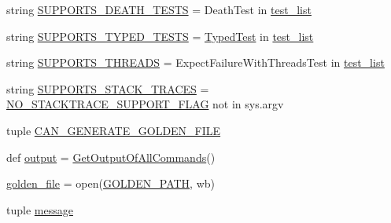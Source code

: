 \begin{DoxyCompactItemize}
\item 
string \mbox{\hyperlink{namespacegoogletest-master_1_1googletest_1_1test_1_1googletest-output-test_ab7a52bcfd53bacc27bf0db84d4077e1a}{S\+U\+P\+P\+O\+R\+T\+S\+\_\+\+D\+E\+A\+T\+H\+\_\+\+T\+E\+S\+TS}} = \textquotesingle{}Death\+Test\textquotesingle{} in \mbox{\hyperlink{namespacegoogletest-master_1_1googletest_1_1test_1_1googletest-output-test_a93698fa9205c2bafeaffda6a6aad40c7}{test\+\_\+list}}
\item 
string \mbox{\hyperlink{namespacegoogletest-master_1_1googletest_1_1test_1_1googletest-output-test_a5dbaeb070a77176882dd38790366e0e9}{S\+U\+P\+P\+O\+R\+T\+S\+\_\+\+T\+Y\+P\+E\+D\+\_\+\+T\+E\+S\+TS}} = \textquotesingle{}\mbox{\hyperlink{class_typed_test}{Typed\+Test}}\textquotesingle{} in \mbox{\hyperlink{namespacegoogletest-master_1_1googletest_1_1test_1_1googletest-output-test_a93698fa9205c2bafeaffda6a6aad40c7}{test\+\_\+list}}
\item 
string \mbox{\hyperlink{namespacegoogletest-master_1_1googletest_1_1test_1_1googletest-output-test_a1113a5326ee787f15e708bff0b066828}{S\+U\+P\+P\+O\+R\+T\+S\+\_\+\+T\+H\+R\+E\+A\+DS}} = \textquotesingle{}Expect\+Failure\+With\+Threads\+Test\textquotesingle{} in \mbox{\hyperlink{namespacegoogletest-master_1_1googletest_1_1test_1_1googletest-output-test_a93698fa9205c2bafeaffda6a6aad40c7}{test\+\_\+list}}
\item 
string \mbox{\hyperlink{namespacegoogletest-master_1_1googletest_1_1test_1_1googletest-output-test_aacbf76d497dcb288b25a766a17b62b69}{S\+U\+P\+P\+O\+R\+T\+S\+\_\+\+S\+T\+A\+C\+K\+\_\+\+T\+R\+A\+C\+ES}} = \mbox{\hyperlink{namespacegoogletest-master_1_1googletest_1_1test_1_1googletest-output-test_a358993e918d2256d325466f48896348f}{N\+O\+\_\+\+S\+T\+A\+C\+K\+T\+R\+A\+C\+E\+\_\+\+S\+U\+P\+P\+O\+R\+T\+\_\+\+F\+L\+AG}} not in sys.\+argv
\item 
tuple \mbox{\hyperlink{namespacegoogletest-master_1_1googletest_1_1test_1_1googletest-output-test_a8f4e22af5e5dde3fc5056b8753b300d3}{C\+A\+N\+\_\+\+G\+E\+N\+E\+R\+A\+T\+E\+\_\+\+G\+O\+L\+D\+E\+N\+\_\+\+F\+I\+LE}}
\item 
def \mbox{\hyperlink{namespacegoogletest-master_1_1googletest_1_1test_1_1googletest-output-test_a734f0a5bd94ba038f4350763c6977129}{output}} = \mbox{\hyperlink{namespacegoogletest-master_1_1googletest_1_1test_1_1googletest-output-test_ae53cb6eb6487f7f2f8ed334f9afb0f4e}{Get\+Output\+Of\+All\+Commands}}()
\item 
\mbox{\hyperlink{namespacegoogletest-master_1_1googletest_1_1test_1_1googletest-output-test_ab39ac5f20df9b2743df8373744639ff9}{golden\+\_\+file}} = open(\mbox{\hyperlink{namespacegoogletest-master_1_1googletest_1_1test_1_1googletest-output-test_ab0041b00c5cd02be70d08c0b84ecf67f}{G\+O\+L\+D\+E\+N\+\_\+\+P\+A\+TH}}, \textquotesingle{}wb\textquotesingle{})
\item 
tuple \mbox{\hyperlink{namespacegoogletest-master_1_1googletest_1_1test_1_1googletest-output-test_a134400907b7ffa228c5e0a3fb1c11dad}{message}}
\end{DoxyCompactItemize}


